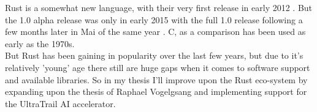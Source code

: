 
%

Rust \cite{rustlang} is a somewhat new language,
with their very first release in early 2012 \cite{rust_releases}.
But the 1.0 alpha release was only in early 2015 \cite{rust_releases}
with the full 1.0 release following a few months later in Mai of the same year \cite{rust_releases}.
C, as a comparison has been used as early as the 1970s.\\
But Rust has been gaining in popularity \cite{rust_popularity} over the last few years, but
due to it's relatively 'young' age there still are huge gaps when it comes to software support and available libraries.
So in my thesis I'll improve upon the Rust eco-system by expanding upon the thesis of Raphael Vogelgsang \cite{raphael}
and implementing support for the UltraTrail \cite{ultratrail} AI accelerator.
